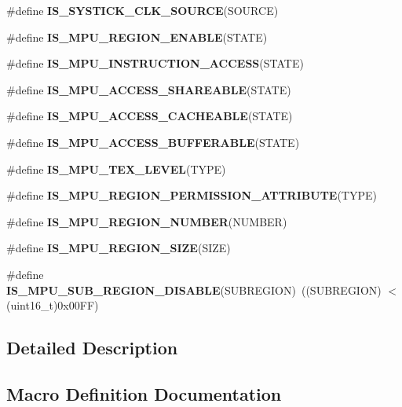 \begin{DoxyCompactItemize}
\item 
\#define {\bfseries I\+S\+\_\+\+S\+Y\+S\+T\+I\+C\+K\+\_\+\+C\+L\+K\+\_\+\+S\+O\+U\+R\+CE}(S\+O\+U\+R\+CE)
\item 
\#define {\bfseries I\+S\+\_\+\+M\+P\+U\+\_\+\+R\+E\+G\+I\+O\+N\+\_\+\+E\+N\+A\+B\+LE}(S\+T\+A\+TE)
\item 
\#define {\bfseries I\+S\+\_\+\+M\+P\+U\+\_\+\+I\+N\+S\+T\+R\+U\+C\+T\+I\+O\+N\+\_\+\+A\+C\+C\+E\+SS}(S\+T\+A\+TE)
\item 
\#define {\bfseries I\+S\+\_\+\+M\+P\+U\+\_\+\+A\+C\+C\+E\+S\+S\+\_\+\+S\+H\+A\+R\+E\+A\+B\+LE}(S\+T\+A\+TE)
\item 
\#define {\bfseries I\+S\+\_\+\+M\+P\+U\+\_\+\+A\+C\+C\+E\+S\+S\+\_\+\+C\+A\+C\+H\+E\+A\+B\+LE}(S\+T\+A\+TE)
\item 
\#define {\bfseries I\+S\+\_\+\+M\+P\+U\+\_\+\+A\+C\+C\+E\+S\+S\+\_\+\+B\+U\+F\+F\+E\+R\+A\+B\+LE}(S\+T\+A\+TE)
\item 
\#define {\bfseries I\+S\+\_\+\+M\+P\+U\+\_\+\+T\+E\+X\+\_\+\+L\+E\+V\+EL}(T\+Y\+PE)
\item 
\#define {\bfseries I\+S\+\_\+\+M\+P\+U\+\_\+\+R\+E\+G\+I\+O\+N\+\_\+\+P\+E\+R\+M\+I\+S\+S\+I\+O\+N\+\_\+\+A\+T\+T\+R\+I\+B\+U\+TE}(T\+Y\+PE)
\item 
\#define {\bfseries I\+S\+\_\+\+M\+P\+U\+\_\+\+R\+E\+G\+I\+O\+N\+\_\+\+N\+U\+M\+B\+ER}(N\+U\+M\+B\+ER)
\item 
\#define {\bfseries I\+S\+\_\+\+M\+P\+U\+\_\+\+R\+E\+G\+I\+O\+N\+\_\+\+S\+I\+ZE}(S\+I\+ZE)
\item 
\#define {\bfseries I\+S\+\_\+\+M\+P\+U\+\_\+\+S\+U\+B\+\_\+\+R\+E\+G\+I\+O\+N\+\_\+\+D\+I\+S\+A\+B\+LE}(S\+U\+B\+R\+E\+G\+I\+ON)~((S\+U\+B\+R\+E\+G\+I\+ON) $<$ (uint16\+\_\+t)0x00\+F\+F)\hypertarget{group___c_o_r_t_e_x___private___macros_gaee7e06047a023e2c70672260269774e1}{}\label{group___c_o_r_t_e_x___private___macros_gaee7e06047a023e2c70672260269774e1}

\end{DoxyCompactItemize}


\subsection{Detailed Description}


\subsection{Macro Definition Documentation}

